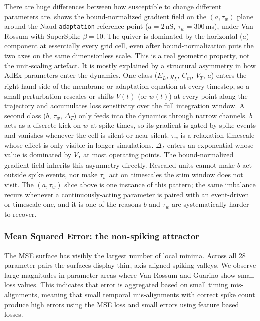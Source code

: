 There are huge differences between how susceptible to change different parameters are.
 shows the bound-normalized gradient field on the $(a, \tau_w)$ plane around the Naud \texttt{adaptation} reference point ($a=2$\,nS, $\tau_w=300$\,ms), under Van Rossum with SuperSpike $\beta=10$.
The quiver is dominated by the horizontal ($a$) component at essentially every grid cell, even after bound-normalization puts the two axes on the same dimensionless scale.
This is a real geometric property, not the unit-scaling artefact.
It is mostly explained by a structural asymmetry in how AdEx parameters enter the dynamics.
One class ($E_L$, $g_L$, $C_m$, $V_T$, $a$) enters the right-hand side of the membrane or adaptation equation at every timestep, so a small perturbation rescales or shifts $V(t)$ (or $w(t)$) at every point along the trajectory and accumulates loss sensitivity over the full integration window.
A second class ($b$, $\tau_w$, $\Delta_T$) only feeds into the dynamics through narrow channels.
$b$ acts as a discrete kick on $w$ at spike times, so its gradient is gated by spike events and vanishes whenever the cell is silent or near-silent.
$\tau_w$ is a relaxation timescale whose effect is only visible in longer simulations.
$\Delta_T$ enters an exponential whose value is dominated by $V_T$ at most operating points.
The bound-normalized gradient field inherits this asymmetry directly.
Rescaled units cannot make $b$ act outside spike events, nor make $\tau_w$ act on timescales the stim window does not visit.
The $(a, \tau_w)$ slice above is one instance of this pattern; the same imbalance recurs whenever a continuously-acting parameter is paired with an event-driven or timescale one, and it is one of the reasons $b$ and $\tau_w$ are systematically harder to recover.

\subsubsection{Mean Squared Error: the non-spiking attractor}\label{sec:results:landscape:mse}

The \gls{MSE} surface has visibly the largest number of local minima.
Across all 28 parameter pairs the surfaces display thin, axis-aligned spiking valleys.
We observe large magnitudes in parameter areas where Van Rossum and Guarino show small loss values.
This indicates that error is aggregated based on small timing mis-alignments,
meaning that small temporal mis-alignments with correct spike count produce high errors using the \gls{MSE} loss and small errors using feature based losses.

